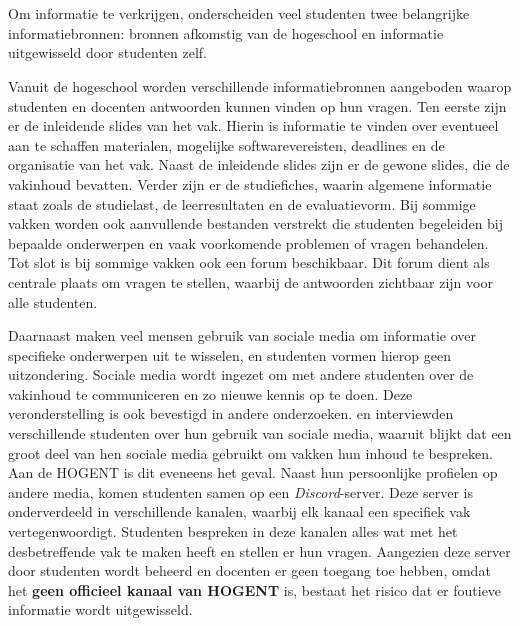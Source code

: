 \chapter{}%
\label{ch:literatuurstudie}

\section{}%
\label{sec:state-of-the-art}

Om informatie te verkrijgen, onderscheiden veel studenten twee belangrijke informatiebronnen: bronnen afkomstig van de hogeschool en informatie uitgewisseld door studenten zelf.

Vanuit de hogeschool worden verschillende informatiebronnen aangeboden waarop studenten en docenten antwoorden kunnen vinden op hun vragen. Ten eerste zijn er de inleidende slides van het vak. Hierin is informatie te vinden over eventueel aan te schaffen materialen, mogelijke softwarevereisten, deadlines en de organisatie van het vak. Naast de inleidende slides zijn er de gewone slides, die de vakinhoud bevatten. Verder zijn er de studiefiches, waarin algemene informatie staat zoals de studielast, de leerresultaten en de evaluatievorm. Bij sommige vakken worden ook aanvullende bestanden verstrekt die studenten begeleiden bij bepaalde onderwerpen en vaak voorkomende problemen of vragen behandelen. Tot slot is bij sommige vakken ook een forum beschikbaar. Dit forum dient als centrale plaats om vragen te stellen, waarbij de antwoorden zichtbaar zijn voor alle studenten.

Daarnaast maken veel mensen gebruik van sociale media om informatie over specifieke onderwerpen uit te wisselen, en studenten vormen hierop geen uitzondering. Sociale media wordt ingezet om met andere studenten over de vakinhoud te communiceren en zo nieuwe kennis op te doen. Deze veronderstelling is ook bevestigd in andere onderzoeken. \textcite{M.Talaue2018} en \textcite{Bal2017} interviewden verschillende studenten over hun gebruik van sociale media, waaruit blijkt dat een groot deel van hen sociale media gebruikt om vakken hun inhoud te bespreken. Aan de HOGENT is dit eveneens het geval. Naast hun persoonlijke profielen op andere media, komen studenten samen op een \textit{Discord}-server. Deze server is onderverdeeld in verschillende kanalen, waarbij elk kanaal een specifiek vak vertegenwoordigt. Studenten bespreken in deze kanalen alles wat met het desbetreffende vak te maken heeft en stellen er hun vragen. Aangezien deze server door studenten wordt beheerd en docenten er geen toegang toe hebben, omdat het \textbf{geen officieel kanaal van HOGENT} is, bestaat het risico dat er foutieve informatie wordt uitgewisseld. 

